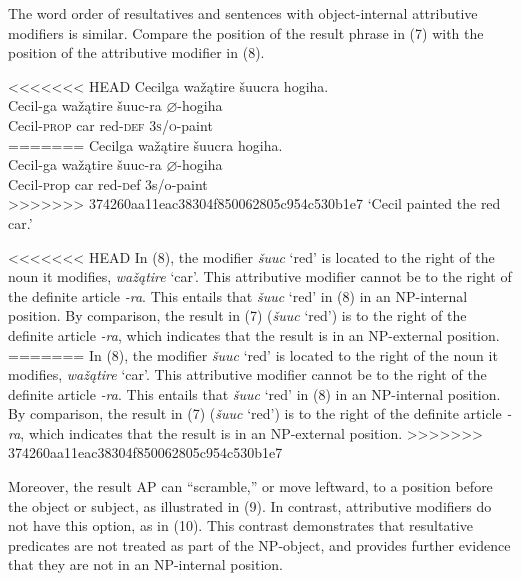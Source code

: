 \documentclass[output=paper]{LSP/langsci}
\begin{document}
\begin{exe}
\begin{exe}
\end{exe}

The word order of resultatives and sentences with object-internal attributive modifiers is similar. Compare the position of the result phrase in (7) with the position of the attributive modifier in (8).

\begin{exe}

<<<<<<< HEAD
\ex \glll Cecilga wažątire šuucra hogiha. \\
Cecil-ga  wažątire šuuc-ra  {$\varnothing$}-hogiha\\
Cecil-\textsc{prop} car red-\textsc{def}  \textsc{3s/o}-paint\\
=======
\ex \glll Cecilga wa\v{z}\k{a}tire \v{s}uucra hogiha. \\
Cecil-ga  wa\v{z}\k{a}tire \v{s}uuc-ra  $\varnothing$-hogiha\\
Cecil-{\textsc prop} car red-{\textsc def}  {\textsc 3s/o}-paint\\
>>>>>>> 374260aa11eac38304f850062805c954c530b1e7
\glt `Cecil painted the red car.'

\end{exe}

<<<<<<< HEAD
In (8), the modifier \textit{šuuc} `red' is located to the right of the noun it modifies, \textit{wažątire} `car'. This attributive modifier cannot be to the right of the definite article \textit{-ra}. This entails that \textit{šuuc} `red' in (8) in an NP-internal position. By comparison, the result in (7) (\textit{šuuc} `red') is to the right of the definite article \textit{-ra}, which indicates that the result is in an NP-external position.
=======
In (8), the modifier \textit{\v{s}uuc} `red' is located to the right of the noun it modifies, \textit{wa\v{z}\k{a}tire} `car'. This attributive modifier cannot be to the right of the definite article \textit{-ra}. This entails that \textit{\v{s}uuc} `red' in (8) in an NP-internal position. By comparison, the result in (7) (\textit{\v{s}uuc} `red') is to the right of the definite article \textit{-ra}, which indicates that the result is in an NP-external position.
>>>>>>> 374260aa11eac38304f850062805c954c530b1e7

Moreover, the result AP can ``scramble,'' or move leftward, to a position before the object or subject, as illustrated in (9). In contrast, attributive modifiers do not have this option, as in (10). This contrast demonstrates that resultative predicates are not treated as part of the NP-object, and provides further evidence that they are not in an NP-internal position.


\end{exe}
\end{document}
